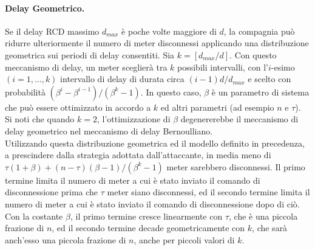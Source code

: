 \paragraph{Delay Geometrico.} Se il delay RCD massimo $d_{max}$ è poche volte maggiore di $d$, la compagnia può ridurre ulteriormente il numero di meter disconnessi applicando una distribuzione geometrica sui periodi di delay consentiti. Sia $k = [d_{max}/d]$. Con questo meccanismo di delay, un meter sceglierà tra $k$ possibili intervalli, con l'$i$-esimo $(i = 1, \ldots, k)$ intervallo di delay di durata circa $(i - 1)d/d_{max}$ e scelto con probabilità $(\beta^i - \beta^{i-1})/(\beta^k - 1)$. In questo caso, $\beta$ è un parametro di sistema che può essere ottimizzato in accordo a $k$ ed altri parametri (ad esempio $n$ e $\tau$). Si noti che quando $k = 2$, l'ottimizzazione di $\beta$ degenererebbe il meccanismo di delay geometrico nel meccanismo di delay Bernoulliano.\\
Utilizzando questa distribuzione geometrica ed il modello definito in precedenza, a prescindere dalla strategia adottata dall'attaccante, in media meno di $\tau(1+\beta) + (n - \tau)(\beta - 1)/(\beta^k - 1)$ meter sarebbero disconnessi. Il primo termine limita il numero di meter a cui è stato inviato il comando di disconnessione prima che $\tau$ meter siano disconnessi, ed il secondo termine limita il numero di meter a cui è stato inviato il comando di disconnessione dopo di ciò. Con la costante $\beta$, il primo termine cresce linearmente con $\tau$, che è una piccola frazione di $n$, ed il secondo termine decade geometricamente con $k$, che sarà anch'esso una piccola frazione di $n$, anche per piccoli valori di $k$.
